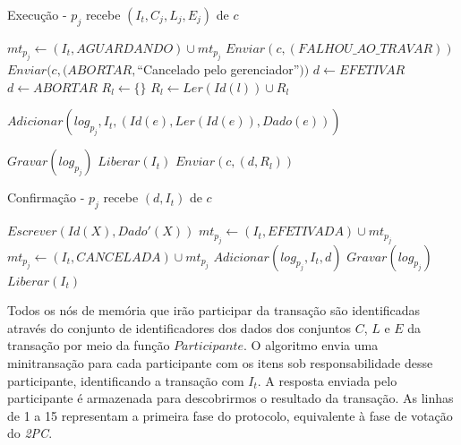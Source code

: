 \documentclass[11pt,twoside,a4paper]{book}
\begin{document}
\begin{algorithm}
    \caption{Execução - $p_j$ recebe $(I_t, C_j, L_j, E_j)$ de $c$}
    \label{alg:mini_participante1}
    \begin{algorithmic}[1]
        \State $mt_{p_j} \gets (I_t, AGUARDANDO) \cup mt_{p_j}$
            \State $Enviar(c, (FALHOU\_AO\_TRAVAR))$
            \State $Enviar(c, (ABORTAR, $``Cancelado pelo gerenciador''$))$
        \Else
            \State $d \gets EFETIVAR$
                    \State $d \gets ABORTAR$
                \EndIf
            \EndFor
            \State $R_l \gets \{\}$
                    \State $R_l \gets Ler(Id(l)) \cup R_l$
                \EndFor
                
                    \State $Adicionar(log_{p_j}, I_t, (Id(e), Ler(Id(e)), Dado(e)) )$
                \EndFor

                \State $Gravar(log_{p_j})$
            \Else
                \State $Liberar(I_t)$
            \EndIf
            \State $Enviar(c, (d, R_l))$
        \EndIf
    \end{algorithmic}
\end{algorithm}

\begin{algorithm}
    \caption{Confirmação - $p_j$ recebe $(d, I_t)$ de $c$}
    \label{alg:mini_participante2}
    \begin{algorithmic}[1]
                \State $Escrever(Id(X), Dado'(X))$
            \EndFor
            \State $mt_{p_j} \gets (I_t, EFETIVADA) \cup mt_{p_j}$
        \Else
            \State $mt_{p_j} \gets (I_t, CANCELADA) \cup mt_{p_j}$
        \EndIf
        \State $Adicionar(log_{p_j}, I_t, d)$
        \State $Gravar(log_{p_j})$
        \State $Liberar(I_t)$
    \end{algorithmic}
\end{algorithm}

Todos os nós de memória que irão participar da transação são identificadas através do conjunto de identificadores dos dados dos conjuntos $C$, $L$ e $E$ da transação por meio da função $Participante$. O algoritmo envia uma minitransação para cada participante com os itens sob responsabilidade desse participante, identificando a transação com $I_t$. A resposta enviada pelo participante é armazenada para descobrirmos o resultado da transação. As linhas de 1 a 15 representam a primeira fase do protocolo, equivalente à fase de votação do \emph{2PC}.
\end{document}
